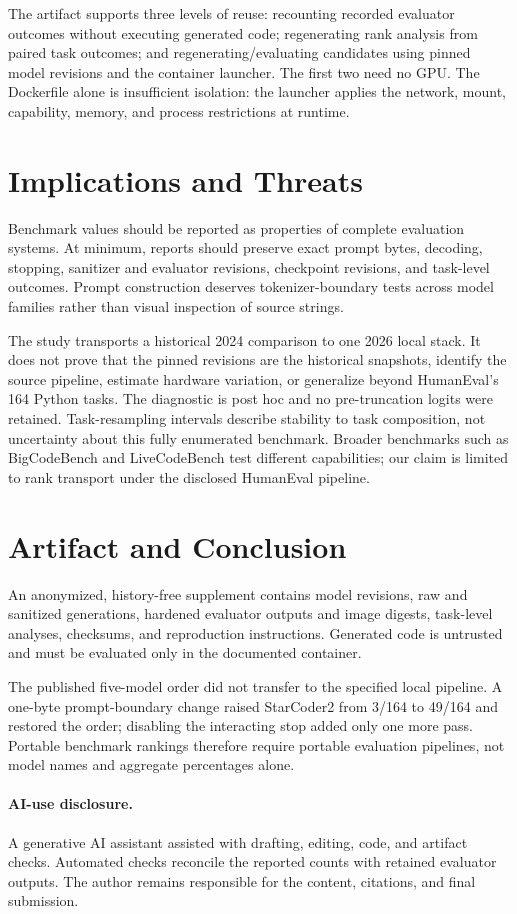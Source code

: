 \documentclass[10pt,conference]{IEEEtran}
\begin{document}
The artifact supports three levels of reuse: recounting recorded evaluator
outcomes without executing generated code; regenerating rank analysis from
paired task outcomes; and regenerating/evaluating candidates using pinned
model revisions and the container launcher. The first two need no GPU.
The Dockerfile alone is insufficient isolation: the launcher applies the
network, mount, capability, memory, and process restrictions at runtime.

\balance
\section{Implications and Threats}
Benchmark values should be reported as properties of complete evaluation
systems. At minimum, reports should preserve exact prompt bytes, decoding,
stopping, sanitizer and evaluator revisions, checkpoint revisions, and
task-level outcomes. Prompt construction deserves tokenizer-boundary tests
across model families rather than visual inspection of source strings.

The study transports a historical 2024 comparison to one 2026 local stack. It
does not prove that the pinned revisions are the historical snapshots, identify
the source pipeline, estimate hardware variation, or generalize beyond
HumanEval's 164 Python tasks. The diagnostic is post hoc and no pre-truncation
logits were retained. Task-resampling intervals describe stability to task
composition, not uncertainty about this fully enumerated benchmark. Broader
benchmarks such as BigCodeBench \cite{zhuo2024bigcodebench} and LiveCodeBench
\cite{jain2024livecodebench} test different capabilities; our claim is limited
to rank transport under the disclosed HumanEval pipeline.

\section{Artifact and Conclusion}
An anonymized, history-free supplement contains model revisions, raw and
sanitized generations, hardened evaluator outputs and image digests,
task-level analyses, checksums, and reproduction instructions. Generated code
is untrusted and must be evaluated only in the documented container.

The published five-model order did not transfer to the specified local
pipeline. A one-byte prompt-boundary change raised StarCoder2 from 3/164 to
49/164 and restored the order; disabling the interacting stop added only one
more pass. Portable benchmark rankings therefore require portable evaluation
pipelines, not model names and aggregate percentages alone.

\paragraph*{AI-use disclosure.} A generative AI assistant assisted with drafting,
editing, code, and artifact checks. Automated checks reconcile the reported
counts with retained evaluator outputs. The author remains responsible for
the content, citations, and final submission.

\newpage


\end{document}
